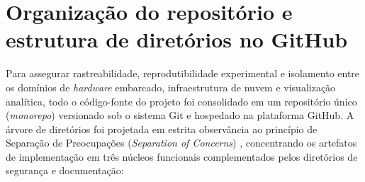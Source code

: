 \documentclass[
	12pt,				%
	openright,			%
	twoside,			%
	a4paper,			%
	english,			%
	brazil				%
	]{abntex2}
\begin{document}
\section{Organização do repositório e estrutura de diretórios no GitHub}

Para assegurar rastreabilidade, reprodutibilidade experimental e isolamento entre os
domínios de \textit{hardware} embarcado, infraestrutura de nuvem e visualização
analítica, todo o código-fonte do projeto foi consolidado em um repositório único
(\textit{monorepo}) versionado sob o sistema Git e hospedado na plataforma GitHub. A
árvore de diretórios foi projetada em estrita observância ao princípio de Separação de
Preocupações (\textit{Separation of Concerns}) \cite{martin2017}, concentrando os
artefatos de implementação em três núcleos funcionais complementados pelos diretórios de
segurança e documentação:
\end{document}
